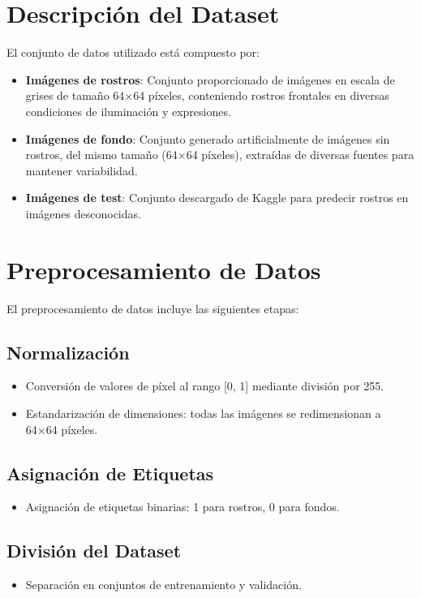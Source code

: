 \documentclass{article}
\begin{document}
\section*{Descripción del Dataset}

El conjunto de datos utilizado está compuesto por:

\begin{itemize}
    \item \textbf{Imágenes de rostros}: Conjunto proporcionado de imágenes en escala de grises de tamaño 64×64 píxeles, conteniendo rostros frontales en diversas condiciones de iluminación y expresiones.
    \item \textbf{Imágenes de fondo}: Conjunto generado artificialmente de imágenes sin rostros, del mismo tamaño (64×64 píxeles), extraídas de diversas fuentes para mantener variabilidad.
    \item \textbf{Imágenes de test}: Conjunto descargado de Kaggle para predecir rostros en imágenes desconocidas.
\end{itemize}

\section*{Preprocesamiento de Datos}

El preprocesamiento de datos incluye las siguientes etapas:

\subsection*{Normalización}
\begin{itemize}
    \item Conversión de valores de píxel al rango [0, 1] mediante división por 255.
    \item Estandarización de dimensiones: todas las imágenes se redimensionan a 64×64 píxeles.
\end{itemize}

\subsection*{Asignación de Etiquetas}
\begin{itemize}
    \item Asignación de etiquetas binarias: 1 para rostros, 0 para fondos.
\end{itemize}

\subsection*{División del Dataset}
\begin{itemize}
    \item Separación en conjuntos de entrenamiento y validación.
\end{itemize}
\end{document}
